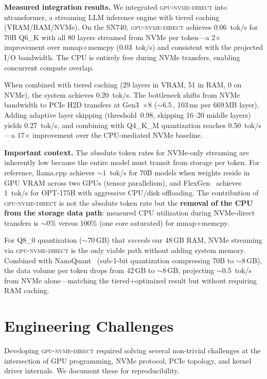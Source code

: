 \documentclass{article}
\newcommand{\sysname}{\textsc{gpu-nvme-direct}}
\newcommand{\GBs}{\,\text{GB/s}}
\begin{document}
\textbf{Measured integration results.} We integrated \sysname{} into
ntransformer, a streaming LLM inference engine with tiered caching
(VRAM/RAM/NVMe). On the SN740, \sysname{} achieves 0.06~tok/s for
70B Q6\_K with all 80 layers streamed from NVMe per token---a 2$\times$
improvement over mmap+memcpy (0.03~tok/s) and consistent with the
projected I/O bandwidth. The CPU is entirely free during NVMe transfers,
enabling concurrent compute overlap.

When combined with tiered caching (29 layers in VRAM, 51 in RAM, 0 on
NVMe), the system achieves 0.20~tok/s. The bottleneck shifts from NVMe
bandwidth to PCIe H2D transfers at Gen3~$\times$8 ($\sim$6.5\GBs{},
103\,ms per 669\,MB layer). Adding adaptive layer skipping
(threshold~0.98, skipping 16--20 middle layers) yields 0.27~tok/s, and
combining with Q4\_K\_M quantization reaches 0.50~tok/s---a
17$\times$ improvement over the CPU-mediated NVMe baseline.

\textbf{Important context.} The absolute token rates for NVMe-only streaming
are inherently low because the entire model must transit from storage per
token. For reference, llama.cpp achieves $\sim$1~tok/s for 70B models when
weights reside in GPU VRAM across two GPUs (tensor parallelism), and
FlexGen~\cite{sheng2023flexgen} achieves 1~tok/s for OPT-175B with
aggressive CPU/disk offloading. The contribution of \sysname{} is not the
absolute token rate but the \textbf{removal of the CPU from the storage data
path}: measured CPU utilization during NVMe-direct transfers is $\sim$0\%
versus 100\% (one core saturated) for mmap+memcpy.

For Q8\_0 quantization ($\sim$70\,GB) that \emph{exceeds} our 48\,GB RAM,
NVMe streaming via \sysname{} is the only viable path without adding
system memory. Combined with NanoQuant~\cite{chong2026nanoquant} (sub-1-bit
quantization compressing 70B to $\sim$8\,GB), the data volume per token
drops from 42\,GB to $\sim$8\,GB, projecting $\sim$0.5~tok/s from NVMe
alone---matching the tiered+optimized result but without requiring RAM
caching.

\section{Engineering Challenges}
\label{sec:bugs}

Developing \sysname{} required solving several non-trivial challenges at the
intersection of GPU programming, NVMe protocol, PCIe topology, and kernel
driver internals. We document these for reproducibility.
\end{document}
